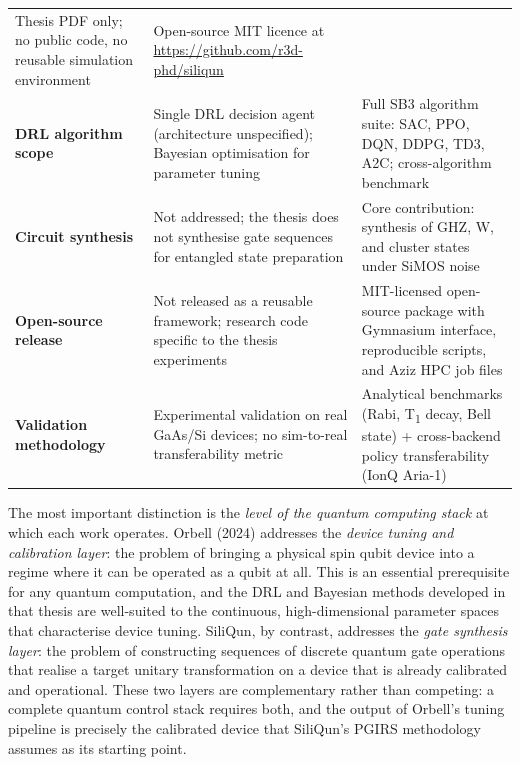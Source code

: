 \begin{table}[ht]
\begin{tabular}{p{3.8cm}p{5.2cm}p{5.2cm}}
  Thesis PDF only; no public code, no reusable simulation environment &
  Open-source MIT licence at \url{https://github.com/r3d-phd/siliqun} \\
\addlinespace
\textbf{DRL algorithm scope} &
  Single DRL decision agent (architecture unspecified); Bayesian optimisation for parameter tuning &
  Full SB3 algorithm suite: SAC, PPO, DQN, DDPG, TD3, A2C; cross-algorithm benchmark \\
\addlinespace
\textbf{Circuit synthesis} &
  Not addressed; the thesis does not synthesise gate sequences for entangled state preparation &
  Core contribution: synthesis of GHZ, W, and cluster states under SiMOS noise \\
\addlinespace
\textbf{Open-source release} &
  Not released as a reusable framework; research code specific to the thesis experiments &
  MIT-licensed open-source package with Gymnasium interface, reproducible scripts, and Aziz HPC job files \\
\addlinespace
\textbf{Validation methodology} &
  Experimental validation on real GaAs/Si devices; no sim-to-real transferability metric &
  Analytical benchmarks (Rabi, T\textsubscript{1} decay, Bell state) + cross-backend policy transferability (IonQ Aria-1) \\
\bottomrule
\end{tabular}
\end{table}

The most important distinction is the \emph{level of the quantum computing
stack} at which each work operates. Orbell (2024) addresses the
\emph{device tuning and calibration layer}: the problem of bringing a
physical spin qubit device into a regime where it can be operated as a
qubit at all. This is an essential prerequisite for any quantum computation,
and the DRL and Bayesian methods developed in that thesis are well-suited
to the continuous, high-dimensional parameter spaces that characterise
device tuning. SiliQun, by contrast, addresses the \emph{gate synthesis
layer}: the problem of constructing sequences of discrete quantum gate
operations that realise a target unitary transformation on a device that is
already calibrated and operational. These two layers are complementary
rather than competing: a complete quantum control stack requires both, and
the output of Orbell's tuning pipeline is precisely the calibrated device
that SiliQun's PGIRS methodology assumes as its starting point.

